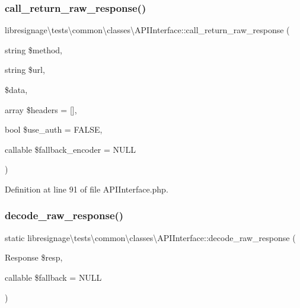 \subsubsection{\texorpdfstring{call\+\_\+return\+\_\+raw\+\_\+response()}{call\_return\_raw\_response()}}
{\footnotesize\ttfamily libresignage\textbackslash{}tests\textbackslash{}common\textbackslash{}classes\textbackslash{}\+A\+P\+I\+Interface\+::call\+\_\+return\+\_\+raw\+\_\+response (\begin{DoxyParamCaption}\item[{string}]{\$method,  }\item[{string}]{\$url,  }\item[{}]{\$data,  }\item[{array}]{\$headers = {\ttfamily \mbox{[}\mbox{]}},  }\item[{bool}]{\$use\+\_\+auth = {\ttfamily FALSE},  }\item[{callable}]{\$fallback\+\_\+encoder = {\ttfamily NULL} }\end{DoxyParamCaption})}



Definition at line 91 of file A\+P\+I\+Interface.\+php.

\mbox{\label{classlibresignage_1_1tests_1_1common_1_1classes_1_1APIInterface_a7488fc7def8ea478483e3334b0906517}} 
\subsubsection{\texorpdfstring{decode\+\_\+raw\+\_\+response()}{decode\_raw\_response()}}
{\footnotesize\ttfamily static libresignage\textbackslash{}tests\textbackslash{}common\textbackslash{}classes\textbackslash{}\+A\+P\+I\+Interface\+::decode\+\_\+raw\+\_\+response (\begin{DoxyParamCaption}\item[{Response}]{\$resp,  }\item[{callable}]{\$fallback = {\ttfamily NULL} }\end{DoxyParamCaption})\hspace{0.3cm}{\ttfamily [static]}}

